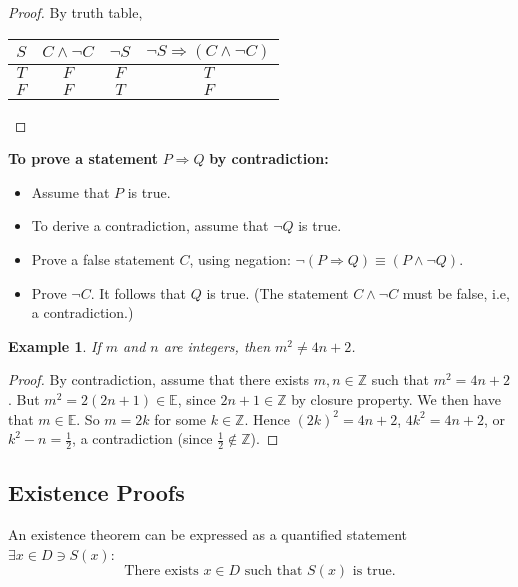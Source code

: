 \documentclass[10pt,reqno]{book}
\theoremstyle{plain}
\newtheorem{example}{Example}
\def\Z{\mathbb{Z}}
\def\E{\mathbb{E}}
\begin{document}
	\begin{proof}
		By truth table,
		\begin{center}
			\begin{tabular}{c|c|c|c}
				$ S $ & $ C \wedge \neg C $ & $ \neg S $ & $ \neg S \Rightarrow (C \wedge \neg C) $ \\ \hline
				$ T $ &        $ F $        &   $ F $    &                  $ T $                   \\ \hline
				$ F $ &        $ F $        &   $ T $    &                  $ F $
			\end{tabular}
		\end{center}
	\end{proof}
	\noindent \textbf{To prove a statement} $ P \Rightarrow Q $ \textbf{by contradiction:}
	\begin{itemize}
		\item Assume that $ P $ is true.
		\item To derive a contradiction, assume that $ \neg Q $ is true.
		\item Prove a false statement $ C $, using negation: $ \neg(P \Rightarrow  Q) \equiv (P \wedge \neg Q) $.
		\item Prove $ \neg C $. It follows that $ Q $ is true. (The statement $ C \wedge \neg C $ must be false, i.e, a contradiction.)
	\end{itemize}

	\begin{example}
		If $ m $ and $ n $ are integers, then $ m^2 \neq 4n+2 $.
	\end{example}
	
	\begin{proof}
		By contradiction, assume that there exists $ m,n \in \Z $ such that $ m^2=4n+2 $. But $ m^2 = 2(2n+1) \in \E $, since $ 2n+1 \in \Z $ by closure property. We then have that $ m \in \E $. So $ m = 2k $ for some $ k \in \Z $. Hence $ (2k)^2 = 4n+2 $, $ 4k^2 = 4n+2 $, or $ k^2 - n = \frac{1}{2} $, a contradiction (since $ \frac{1}{2} \notin \Z $).
	\end{proof}

	\subsection*{Existence Proofs}
	
	An existence theorem can be expressed as a quantified statement $ \exists x \in D \ni S(x) $: 
	\[ \text{There exists } x \in D \text{ such that } S(x) \text{ is true.} \]
	
\end{document}
